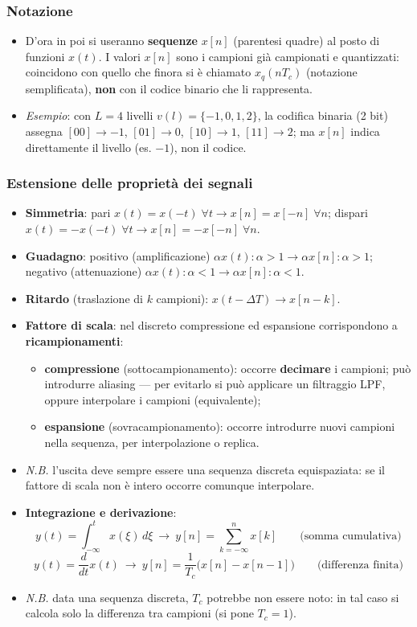 \documentclass[12pt, a4paper]{article}
\begin{document}
\subsubsection{Notazione}
\begin{itemize}
    \item D'ora in poi si useranno \textbf{sequenze} $x[n]$ (parentesi quadre) al posto di funzioni $x(t)$. I valori $x[n]$ sono i campioni già campionati e quantizzati: coincidono con quello che finora si è chiamato $x_q(nT_c)$ (notazione semplificata), \textbf{non} con il codice binario che li rappresenta.
    \item \textit{Esempio}: con $L=4$ livelli $v(l)=\{-1,0,1,2\}$, la codifica binaria (2 bit) assegna $[00]\to-1$, $[01]\to0$, $[10]\to1$, $[11]\to2$; ma $x[n]$ indica direttamente il livello (es. $-1$), non il codice.
\end{itemize}

\subsubsection{Estensione delle proprietà dei segnali}
\begin{itemize}
    \item \textbf{Simmetria}: pari $x(t)=x(-t)\;\forall t \to x[n]=x[-n]\;\forall n$; dispari $x(t)=-x(-t)\;\forall t \to x[n]=-x[-n]\;\forall n$.
    \item \textbf{Guadagno}: positivo (amplificazione) $\alpha x(t):\alpha>1 \to \alpha x[n]:\alpha>1$; negativo (attenuazione) $\alpha x(t):\alpha<1 \to \alpha x[n]:\alpha<1$.
    \item \textbf{Ritardo} (traslazione di $k$ campioni): $x(t-\Delta T) \to x[n-k]$.
    \item \textbf{Fattore di scala}: nel discreto compressione ed espansione corrispondono a \textbf{ricampionamenti}:
    \begin{itemize}
        \item \textbf{compressione} (sottocampionamento): occorre \textbf{decimare} i campioni; può introdurre aliasing — per evitarlo si può applicare un filtraggio LPF, oppure interpolare i campioni (equivalente);
        \item \textbf{espansione} (sovracampionamento): occorre introdurre nuovi campioni nella sequenza, per interpolazione o replica.
    \end{itemize}
    \item[] \textit{N.B.} l'uscita deve sempre essere una sequenza discreta equispaziata: se il fattore di scala non è intero occorre comunque interpolare.
    \item \textbf{Integrazione e derivazione}:
    $$y(t)=\int_{-\infty}^{t} x(\xi)\,d\xi \ \to\ y[n]=\sum_{k=-\infty}^{n} x[k] \qquad \text{(somma cumulativa)}$$
    $$y(t)=\frac{d}{dt}x(t) \ \to\ y[n]=\frac{1}{T_c}\big(x[n]-x[n-1]\big) \qquad \text{(differenza finita)}$$
    \item[] \textit{N.B.} data una sequenza discreta, $T_c$ potrebbe non essere noto: in tal caso si calcola solo la differenza tra campioni (si pone $T_c=1$).
\end{itemize}
\end{document}
